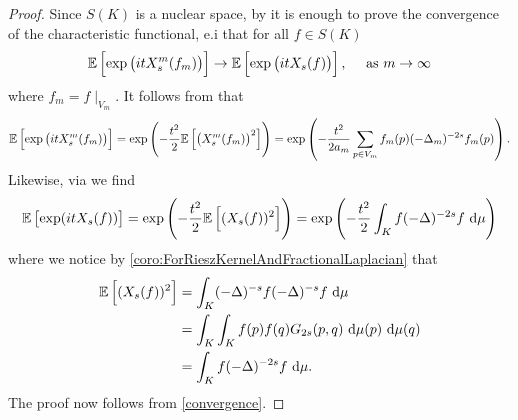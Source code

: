 \begin{proof}
	Since $S(K)$ is a nuclear space, by \cite[Corollary~2.4]{biermé2017generalizedrandomfieldslevys} it is enough to prove the convergence of the characteristic functional, e.i that for all $f \in S(K)$
	\begin{equation}
		\mathbb{E} \left[\exp \left(itX_{s}^{m}(f_m) \right)\right] \to \mathbb{E} \left[\exp\left(itX_{s}(f)\right)\right], \quad \text{ as } m \to \infty
	\end{equation} 
	where $f_m = f \mid_{V_m}$. It follows from  that
	\begin{equation}
		\e \left[\exp\left(itX_{s}^{m}(f_m)\right)\right] = \exp \left(-\frac{t^2}{2} \e \left[ \left(X_{s}^{m}(f_m) \right)^2\right]\right) = \exp \left(-\frac{t^2}{2a_m} \sum_{p \in V_m} f_m(p) (-\Delta_m)^{-2s} f_m(p)\right).
	\end{equation}
	Likewise, via  we find
	\begin{equation}
		\mathbb{E} \left[\exp(i t X_{s}(f))\right] = \exp\left(-\frac{t^2}{2} \mathbb{E} \left[(X_{s}(f))^2\right]\right) = \exp\left(-\frac{t^2}{2}\int_{K} f (-\Delta)^{-2s}f \ \text{d} \mu\right)
	\end{equation} 
	where we notice by \cref{coro:ForRieszKernelAndFractionalLaplacian} that
	\begin{align}
		\mathbb{E} \left[(X_{s}(f))^2\right] &= \int_{K} (-\Delta)^{-s}f (-\Delta)^{-s}f \ \text{d} \mu \\
		& = \int_{K} \int_{K} f(p)f(q) G_{2s}(p,q) \ \text{d}\mu(p) \ \text{d} \mu(q) \\
		& = \int_{K} f (-\Delta)^{-2s}f \ \text{d} \mu.
	\end{align}
	The proof now follows from \cref{convergence}.
\end{proof}